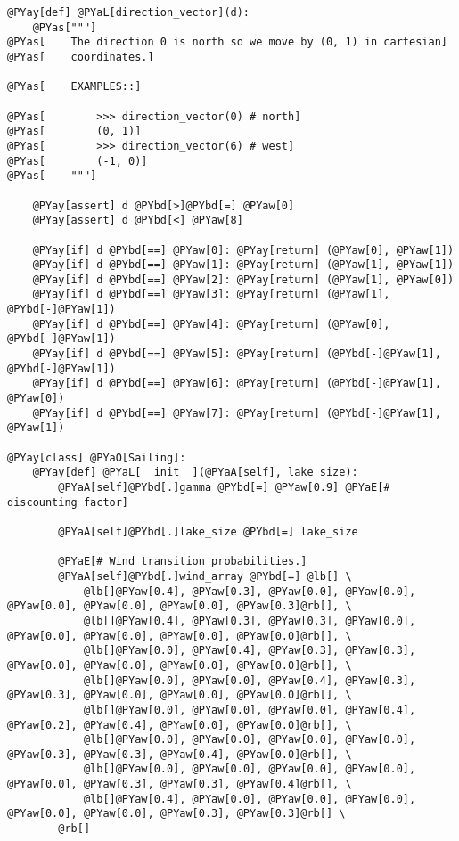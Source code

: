 \begin{Verbatim}[commandchars=@\[\]]
@PYay[def] @PYaL[direction_vector](d):
    @PYas["""]
@PYas[    The direction 0 is north so we move by (0, 1) in cartesian]
@PYas[    coordinates.]

@PYas[    EXAMPLES::]

@PYas[        >>> direction_vector(0) # north]
@PYas[        (0, 1)]
@PYas[        >>> direction_vector(6) # west]
@PYas[        (-1, 0)]
@PYas[    """]

    @PYay[assert] d @PYbd[>]@PYbd[=] @PYaw[0]
    @PYay[assert] d @PYbd[<] @PYaw[8]

    @PYay[if] d @PYbd[==] @PYaw[0]: @PYay[return] (@PYaw[0], @PYaw[1])
    @PYay[if] d @PYbd[==] @PYaw[1]: @PYay[return] (@PYaw[1], @PYaw[1])
    @PYay[if] d @PYbd[==] @PYaw[2]: @PYay[return] (@PYaw[1], @PYaw[0])
    @PYay[if] d @PYbd[==] @PYaw[3]: @PYay[return] (@PYaw[1], @PYbd[-]@PYaw[1])
    @PYay[if] d @PYbd[==] @PYaw[4]: @PYay[return] (@PYaw[0], @PYbd[-]@PYaw[1])
    @PYay[if] d @PYbd[==] @PYaw[5]: @PYay[return] (@PYbd[-]@PYaw[1], @PYbd[-]@PYaw[1])
    @PYay[if] d @PYbd[==] @PYaw[6]: @PYay[return] (@PYbd[-]@PYaw[1], @PYaw[0])
    @PYay[if] d @PYbd[==] @PYaw[7]: @PYay[return] (@PYbd[-]@PYaw[1], @PYaw[1])

@PYay[class] @PYaO[Sailing]:
    @PYay[def] @PYaL[__init__](@PYaA[self], lake_size):
        @PYaA[self]@PYbd[.]gamma @PYbd[=] @PYaw[0.9] @PYaE[# discounting factor]

        @PYaA[self]@PYbd[.]lake_size @PYbd[=] lake_size

        @PYaE[# Wind transition probabilities.]
        @PYaA[self]@PYbd[.]wind_array @PYbd[=] @lb[] \
            @lb[]@PYaw[0.4], @PYaw[0.3], @PYaw[0.0], @PYaw[0.0], @PYaw[0.0], @PYaw[0.0], @PYaw[0.0], @PYaw[0.3]@rb[], \
            @lb[]@PYaw[0.4], @PYaw[0.3], @PYaw[0.3], @PYaw[0.0], @PYaw[0.0], @PYaw[0.0], @PYaw[0.0], @PYaw[0.0]@rb[], \
            @lb[]@PYaw[0.0], @PYaw[0.4], @PYaw[0.3], @PYaw[0.3], @PYaw[0.0], @PYaw[0.0], @PYaw[0.0], @PYaw[0.0]@rb[], \
            @lb[]@PYaw[0.0], @PYaw[0.0], @PYaw[0.4], @PYaw[0.3], @PYaw[0.3], @PYaw[0.0], @PYaw[0.0], @PYaw[0.0]@rb[], \
            @lb[]@PYaw[0.0], @PYaw[0.0], @PYaw[0.0], @PYaw[0.4], @PYaw[0.2], @PYaw[0.4], @PYaw[0.0], @PYaw[0.0]@rb[], \
            @lb[]@PYaw[0.0], @PYaw[0.0], @PYaw[0.0], @PYaw[0.0], @PYaw[0.3], @PYaw[0.3], @PYaw[0.4], @PYaw[0.0]@rb[], \
            @lb[]@PYaw[0.0], @PYaw[0.0], @PYaw[0.0], @PYaw[0.0], @PYaw[0.0], @PYaw[0.3], @PYaw[0.3], @PYaw[0.4]@rb[], \
            @lb[]@PYaw[0.4], @PYaw[0.0], @PYaw[0.0], @PYaw[0.0], @PYaw[0.0], @PYaw[0.0], @PYaw[0.3], @PYaw[0.3]@rb[] \
        @rb[]


\end{Verbatim}
